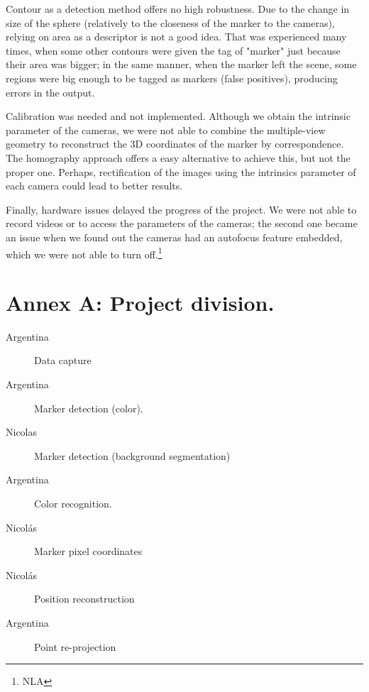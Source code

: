 \documentclass[a4paper,12pt]{article}
\begin{document}
Contour as a detection method offers no high robustness. Due to the change in size of the sphere (relatively to the closeness of the marker to the cameras), relying on area as a descriptor is not a good idea. That was experienced many times, when some other contours were given the tag of "marker" just because their area was bigger; in the same manner, when the marker left the scene, some regions were big enough to be tagged as markers (false positives), producing errors in the output.


Calibration was needed and not implemented. Although we obtain the intrinsic parameter of the cameras, we were not able to combine the multiple-view geometry to reconstruct the 3D coordinates of the marker by correspondence. The homography approach offers a easy alternative to achieve this, but not the proper one. Perhaps, rectification of the images using the intrinsics parameter of each camera could lead to better results.


Finally, hardware issues delayed the progress of the project. We were not able to record videos or to access the parameters of the cameras; the second one became an issue when we found out the cameras had an autofocus feature embedded, which we were not able to turn off.\footnote{NLA}


\section*{Annex A: Project division.}
\begin{description}
\item[Argentina] Data capture
\item[Argentina] Marker detection (color).
\item[Nicolas] Marker detection (background segmentation)
\item [Argentina] Color recognition.
\item[Nicolás] Marker pixel coordinates
\item[Nicolás]Position reconstruction
\item[Argentina]Point re-projection

\end{description}
\nocite{*}





\end{document}
